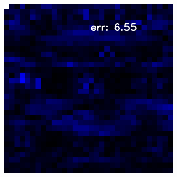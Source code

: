 \begin{figure}
\begin{subfigure}[b]{0.19\linewidth}
	\end{subfigure}
	\begin{subfigure}[b]{0.19\linewidth}
		\includegraphics[width=\linewidth]{./Figures/gcnn_synthetic/eval_2_error_an2-8-1000.png}
	\end{subfigure}
	

\end{figure}
